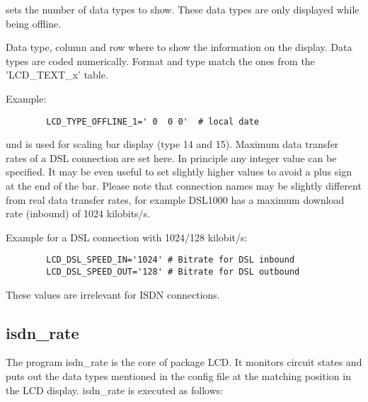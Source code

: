 \begin{description}

       sets the number of data types to show.
      These data types are only displayed while being offline.



         Data type, column and row where to 
      show the information on the display. Data types are coded numerically.
      Format and type match the ones from the 'LCD\_TEXT\_x' table.

        Example:
\begin{example}
\begin{verbatim}
        LCD_TYPE_OFFLINE_1=' 0  0 0'  # local date
\end{verbatim}
\end{example}

         und  
        is used for scaling bar display (type 14 and 15). Maximum data transfer rates of a 
        DSL connection are set here. In principle any integer value can be specified. 
        It may be even useful to set slightly higher values to avoid a plus sign at the end 
        of the bar.
        Please note that connection names may be slightly different from real data transfer 
        rates, for example DSL1000 has a maximum download rate (inbound) of 1024 kilobits/s. 

        Example for a DSL connection with 1024/128 kilobit/s:
\begin{example}
\begin{verbatim}
        LCD_DSL_SPEED_IN='1024' # Bitrate for DSL inbound
        LCD_DSL_SPEED_OUT='128' # Bitrate for DSL outbound
\end{verbatim}
\end{example}

        These values are irrelevant for ISDN connections. 
        
\end{description}

\subsection{isdn\_rate}
 The program \glqq{}isdn\_rate\grqq{} is the core of package LCD. It monitors circuit states 
 and puts out the data types mentioned in the config file at the matching position in the LCD
 display.
 isdn\_rate is executed as follows:
 
